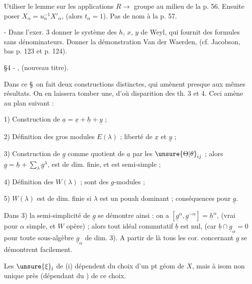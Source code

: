 Utiliser le lemme sur les applications $R\longrightarrow$ groupe au milieu de la p. 56.
Ensuite poser $X_\alpha=u_\alpha^{-1}X'_\alpha$, (alors $t_\alpha=1$). Pas de nom à la p. 57.

\uline{} - Dans l'exer. 3 donner le système des $h$, $x$, $y$ de Weyl, qui fournit des
formules sans dénominateurs. Donner la démonstration Van der Waerden, (cf.
Jacobson, bas p. 123 et p. 124).

\S4 - , (nouveau titre).

Dans ce \S\ on fait deux constructions distinctes, qui amènent presque aux
mêmes résultats. On en laissera tomber une, d'où disparition des th. 3 et 4.
Ceci amène au plan suivant :

1) Construction de $\underline a=\underline x+\underline h+\underline y$ ;

2) Définition des gros modules $E(\lambda)$ ; liberté de $\underline x$ et $\underline y$ ;

3) Construction de $\underline g$ comme quotient de $\underline a$ par les $\unsure{\Theta|\theta}_{ij}$ ; alors
$\underline g=\underline h+\sum_\lambda\underline g^\lambda$,
est de dim. finie, et est semi-simple ;

4) Définition des $W(\lambda)$ ; sont des $g$-modules ;

5) $W(\lambda)$ est de dim. finie si $\lambda$ est un pouah dominant ; conséquences pour $\underline g$.

Dans 3) la semi-simplicité de $\underline g$ se démontre ainsi : on a
$[\underline g^\alpha,\underline g^{-\alpha}]=\underline h^\alpha$,
(vrai pour $\alpha$ simple, et $W$ opère) ; alors tout idéal commutatif $\underline b$ est nul, (car
$\underline b\cap\underline g_\alpha=0$ pour toute sous-algèbre $\underline g_\alpha$ de dim. 3). A partir de là tous les cor.
concernant $\underline g$ se démontrent facilement.


Les $\unsure{\xi}_l$ de (i) dépendent du choix d'un pt géom de $X$,
mais à isom non unique près (dépendant du
) 
  de ce choix.

